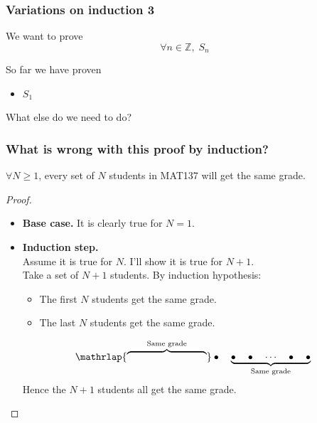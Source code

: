 \begin{frame}
	\frametitle{Variations on induction 3}

	We want to prove
	\[
		\forall n \in \mathbb{Z}, \; S_{n}
	\]

	\vfill

	So far we have proven
	\begin{itemize}
		\item $S_{1}$
	\end{itemize}

	\vfill

	What else do we need to do?
\end{frame}

\begin{frame}
	\frametitle{What is wrong with this proof by induction?}
	\fontsize{13}{13}\selectfont

	\vspace{-1.5mm}
	\begin{theorem}
		$\forall N \geq 1$, every set of $N$ students in MAT137 will get the same
		grade.
	\end{theorem}
	\vspace{-1mm}

	\begin{proof}
		\begin{itemize}
			\item {\bfseries Base case.} It is clearly true for $N=1$.

			\item {\bfseries Induction step.} \\ Assume it is true for $N$. I'll show
				it is true for $N+1$. \\ Take a set of $N+1$ students. By induction
				hypothesis:
				\begin{itemize}
					\item The first $N$ students get the same grade.

					\item The last $N$ students get the same grade.
				\end{itemize}
				\[
					\mathrlap{\overbrace{\phantom{\bullet \quad \bullet \quad \cdots \quad
					\bullet \quad \bullet }}^{\text{Same grade}}}\bullet \quad \underbrace{\bullet
					\quad \bullet \quad \cdots \quad \bullet \quad \bullet}_{\text{Same
					grade}}
				\]
				Hence the $N+1$ students all get the same grade.
		\end{itemize}
	\end{proof}
\end{frame}


